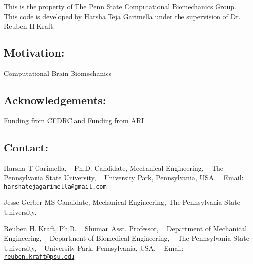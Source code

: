 This is the property of The Penn State Computational Biomechanics Group. ~\newline
This code is developed by Harsha Teja Garimella under the supervision of Dr. Reuben H Kraft.

\subsection*{Motivation\+:}

Computational Brain Biomechanics

\subsection*{Acknowledgements\+:}

Funding from C\+F\+D\+RC and Funding from A\+RL

\subsection*{Contact\+:}

Harsha T Garimella, ~\newline
 Ph.\+D. Candidate, Mechanical Engineering, ~\newline
 The Pennsylvania State University, ~\newline
 University Park, Pennsylvania, U\+SA. ~\newline
 Email\+: \href{mailto:harshatejagarimella@gmail.com}{\tt harshatejagarimella@gmail.\+com}

Jesse Gerber MS Candidate, Mechanical Engineering, The Pennsylvania State University.

Reuben H. Kraft, Ph.\+D. ~\newline
 Shuman Asst. Professor, ~\newline
 Department of Mechanical Engineering, ~\newline
 Department of Biomedical Engineering, ~\newline
 The Pennsylvania State University, ~\newline
 University Park, Pennsylvania, U\+SA. ~\newline
 Email\+: \href{mailto:reuben.kraft@psu.edu}{\tt reuben.\+kraft@psu.\+edu} 